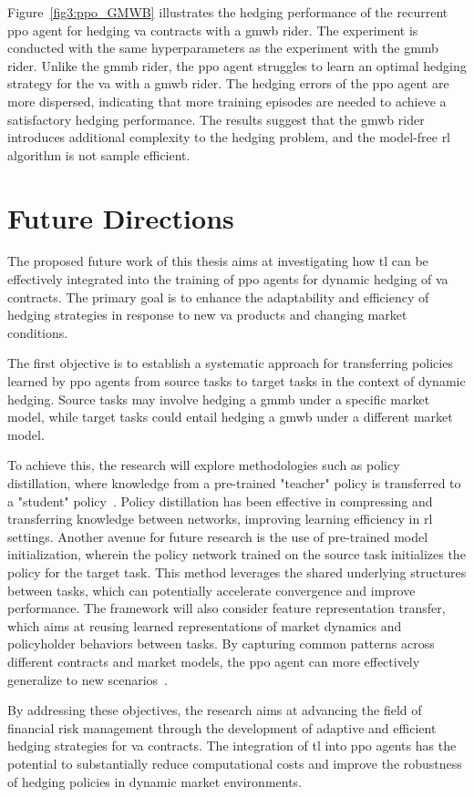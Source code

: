 Figure~\ref{fig3:ppo_GMWB} illustrates the hedging performance of the recurrent \gls{ppo} agent for hedging \gls{va} contracts with a \gls{gmwb} rider.
The experiment is conducted with the same hyperparameters as the experiment with the \gls{gmmb} rider.
Unlike the \gls{gmmb} rider, the \gls{ppo} agent struggles to learn an optimal hedging strategy for the \gls{va} with a \gls{gmwb} rider.
The hedging errors of the \gls{ppo} agent are more dispersed, indicating that more training episodes are needed to achieve a satisfactory hedging performance.
The results suggest that the \gls{gmwb} rider introduces additional complexity to the hedging problem, and the model-free \gls{rl} algorithm is not sample efficient.

\section{Future Directions} \label{sec:FutureDirections}

The proposed future work of this thesis aims at investigating how \gls{tl} can be effectively integrated into the training of \gls{ppo} agents for dynamic hedging of \gls{va} contracts. 
The primary goal is to enhance the adaptability and efficiency of hedging strategies in response to new \gls{va} products and changing market conditions. 


The first objective is to establish a systematic approach for transferring policies learned by \gls{ppo} agents from source tasks to target tasks in the context of dynamic hedging. 
Source tasks may involve hedging a \gls{gmmb} under a specific market model, while target tasks could entail hedging a \gls{gmwb} under a different market model.

To achieve this, the research will explore methodologies such as policy distillation, where knowledge from a pre-trained "teacher" policy is transferred to a "student" policy~\citep{rusu2015policy}.
Policy distillation has been effective in compressing and transferring knowledge between networks, improving learning efficiency in \gls{rl} settings.
Another avenue for future research is the use of pre-trained model initialization, wherein the policy network trained on the source task initializes the policy for the target task. 
This method leverages the shared underlying structures between tasks, which can potentially accelerate convergence and improve performance.
The framework will also consider feature representation transfer, which aims at reusing learned representations of market dynamics and policyholder behaviors between tasks. 
By capturing common patterns across different contracts and market models, the \gls{ppo} agent can more effectively generalize to new scenarios~\citep{bengio2012deep}.

By addressing these objectives, the research aims at advancing the field of financial risk management through the development of adaptive and efficient hedging strategies for \gls{va} contracts. The integration of \gls{tl} into \gls{ppo} agents has the potential to substantially reduce computational costs and improve the robustness of hedging policies in dynamic market environments.